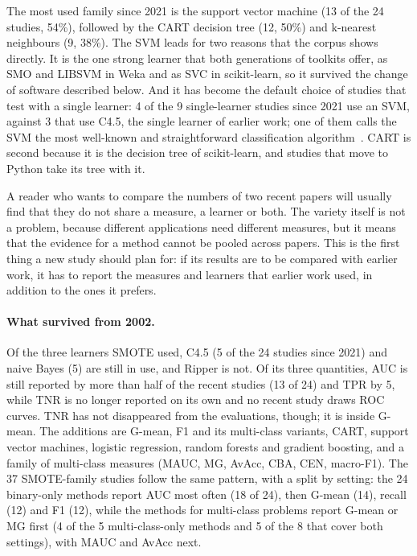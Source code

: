 The most used family since 2021 is the support vector machine (13 of the 24 studies, 54\%), followed by the CART decision tree (12, 50\%) and k-nearest neighbours (9, 38\%). The SVM leads for two reasons that the corpus shows directly. It is the one strong learner that both generations of toolkits offer, as SMO and LIBSVM in Weka and as SVC in scikit-learn, so it survived the change of software described below. And it has become the default choice of studies that test with a single learner: 4 of the 9 single-learner studies since 2021 use an SVM, against 3 that use C4.5, the single learner of earlier work; one of them calls the SVM the most well-known and straightforward classification algorithm~\parencite{palli2022cbhsid}. CART is second because it is the decision tree of scikit-learn, and studies that move to Python take its tree with it.

A reader who wants to compare the numbers of two recent papers will usually find that they do not share a measure, a learner or both. The variety itself is not a problem, because different applications need different measures, but it means that the evidence for a method cannot be pooled across papers. This is the first thing a new study should plan for: if its results are to be compared with earlier work, it has to report the measures and learners that earlier work used, in addition to the ones it prefers.

\paragraph{What survived from 2002.} Of the three learners SMOTE used, C4.5 (5 of the 24 studies since 2021) and naive Bayes (5) are still in use, and Ripper is not. Of its three quantities, AUC is still reported by more than half of the recent studies (13 of 24) and TPR by 5, while TNR is no longer reported on its own and no recent study draws ROC curves. TNR has not disappeared from the evaluations, though; it is inside G-mean. The additions are G-mean, F1 and its multi-class variants, CART, support vector machines, logistic regression, random forests and gradient boosting, and a family of multi-class measures (MAUC, MG, AvAcc, CBA, CEN, macro-F1). The 37 SMOTE-family studies follow the same pattern, with a split by setting: the 24 binary-only methods report AUC most often (18 of 24), then G-mean (14), recall (12) and F1 (12), while the methods for multi-class problems report G-mean or MG first (4 of the 5 multi-class-only methods and 5 of the 8 that cover both settings), with MAUC and AvAcc next.

